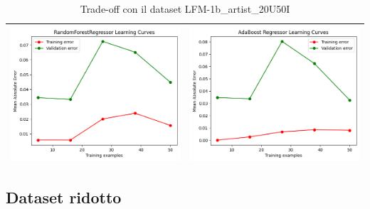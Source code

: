 \begin{table}[H]
\begin{tabularx}{\textwidth}{|X|X|}
        \includegraphics[width=\linewidth, trim=0 0 0 0]{images/RandomForestRegressor_Azure_lc2.png} &
        \includegraphics[width=\linewidth, trim=0 0 0 0]{images/AdaBoostRegressor_Azure_lc2.png} \\
        \hline
    \end{tabularx}
    \caption{Trade-off con il dataset LFM-1b\_artist\_20U50I}
    \label{tab:emissions_info}
\end{table}



\subsection{Dataset ridotto}

